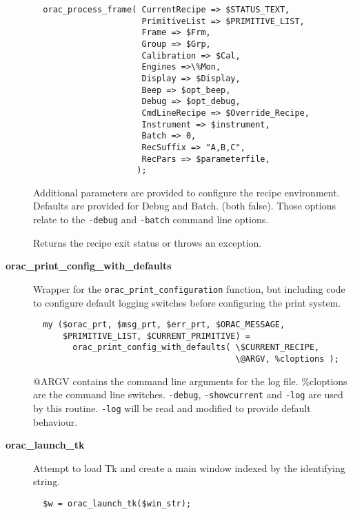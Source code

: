 \begin{description}
\begin{verbatim}
  orac_process_frame( CurrentRecipe => $STATUS_TEXT,
                      PrimitiveList => $PRIMITIVE_LIST,
                      Frame => $Frm,
                      Group => $Grp,
                      Calibration => $Cal,
                      Engines =>\%Mon,
                      Display => $Display,
                      Beep => $opt_beep,
                      Debug => $opt_debug,
                      CmdLineRecipe => $Override_Recipe,
                      Instrument => $instrument,
                      Batch => 0,
                      RecSuffix => "A,B,C",
                      RecPars => $parameterfile,
                     );
\end{verbatim}


Additional parameters are provided to configure the recipe
environment. Defaults are provided for Debug and Batch.
(both false). Those options relate to the \texttt{-debug} and \texttt{-batch}
command line options.



Returns the recipe exit status or throws an exception.


\item[{\textbf{orac\_print\_config\_with\_defaults}}] \mbox{}

Wrapper for the \texttt{orac\_print\_configuration} function, but including
code to configure default logging switches before configuring the
print system.

\begin{verbatim}
  my ($orac_prt, $msg_prt, $err_prt, $ORAC_MESSAGE,
      $PRIMITIVE_LIST, $CURRENT_PRIMITIVE) =
        orac_print_config_with_defaults( \$CURRENT_RECIPE,
                                         \@ARGV, %cloptions );
\end{verbatim}


@ARGV contains the command line arguments for the log file. \%cloptions
are the command line switches. \texttt{-debug}, \texttt{-showcurrent} and \texttt{-log}
are used by this routine. \texttt{-log} will be read and modified to provide
default behaviour.


\item[{\textbf{orac\_launch\_tk}}] \mbox{}

Attempt to load Tk and create a main window indexed by the identifying
string.

\begin{verbatim}
  $w = orac_launch_tk($win_str);
\end{verbatim}



\end{description}
